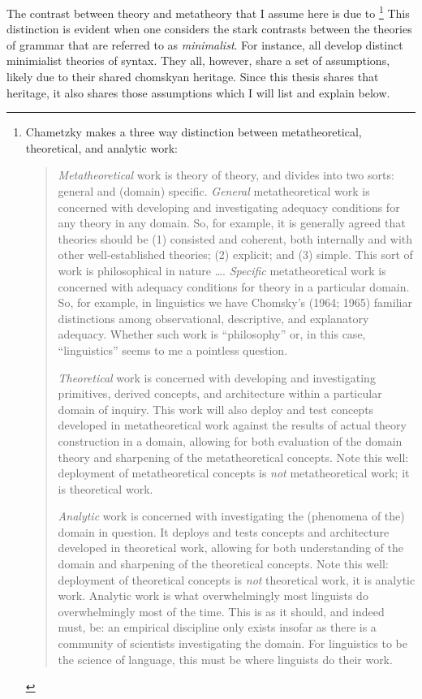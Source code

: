 \documentclass[MilwayThesis]{subfiles}
\begin{document}
The contrast between theory and metatheory that I assume here is due to \textcite{chametzky1996theory}\footnote{
	Chametzky makes a three way distinction between metatheoretical, theoretical, and analytic work:
	\begin{quote}
		\textit{Metatheoretical} work is theory of theory, and divides into two sorts: general and (domain) specific.
		\textit{General} metatheoretical work is concerned with developing and investigating adequacy conditions for any theory in any domain.
		So, for example, it is generally agreed that theories should be (1) consisted and coherent, both internally and with other well-established theories; (2) explicit; and (3) simple. This sort of work is philosophical in nature \dots.
		\textit{Specific} metatheoretical work is concerned with adequacy conditions for theory in a particular domain.
		So, for example, in linguistics	we have Chomsky's (1964; 1965) familiar distinctions among observational, descriptive, and explanatory adequacy.
		Whether such work is ``philosophy'' or, in this case, ``linguistics'' seems to me a pointless question.
		
		\textit{Theoretical} work is concerned with developing and investigating primitives, derived concepts, and architecture within a particular domain of inquiry. 
		This work will also deploy and test concepts developed in metatheoretical work against the results of actual theory construction in a domain, allowing for both evaluation of the domain theory and sharpening of the metatheoretical concepts. 
		Note this well: deployment of metatheoretical concepts is \textit{not} metatheoretical work; it is theoretical work.
		
		\textit{Analytic} work is concerned with investigating the (phenomena of the) domain in question.
		It deploys and tests concepts and architecture developed in theoretical work, allowing for both understanding of the domain and sharpening of the theoretical concepts. 
		Note this well: deployment of theoretical concepts is \textit{not} theoretical work, it is analytic work. 
		Analytic work is what overwhelmingly most linguists do overwhelmingly most of the time.
		This is as it should, and indeed must, be: an empirical discipline only exists insofar as there is a community of scientists investigating the domain.
		For linguistics to be the science of language, this must be where linguists do their work.
		\parencite[xvii\textit{ff}]{chametzky1996theory}
	\end{quote}
	}
This distinction is evident when one considers the stark contrasts between the theories of grammar that are referred to as \textit{minimalist}.
For instance, \textcite{chomsky2000minimalist,hornstein2009theory,frampton2008crash,epstein2006derivations,borer2005name,borer2005normal,borer2013taking} all develop distinct minimialist theories of syntax.
They all, however, share a set of assumptions, likely due to their shared chomskyan heritage.
Since this thesis shares that heritage, it also shares those assumptions which I will list and explain below.
\end{document}
